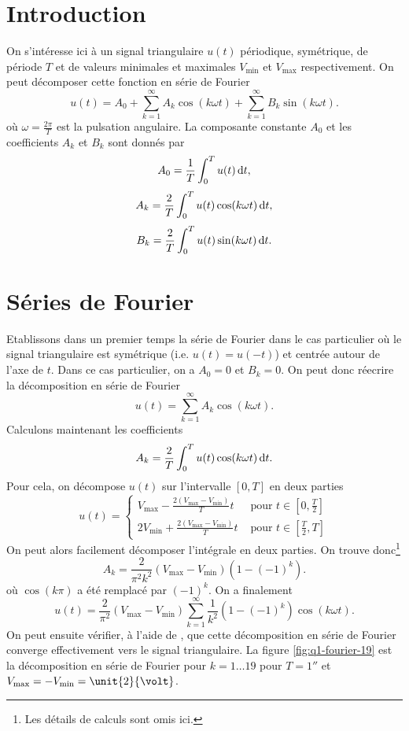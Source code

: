 

\section{Introduction}
On s'intéresse ici à un signal triangulaire $u(t)$
périodique, symétrique, de période $T$ et de valeurs 
minimales et maximales $V_{\text{min}}$ et $V_{\text{max}}$
respectivement. On peut décomposer cette fonction
en série de Fourier
\begin{equation}
	u(t) = A_0 + \sum_{k=1}^{\infty} A_k\cos(k\omega t)
	+ \sum_{k=1}^{\infty} B_k\sin(k\omega t).
	\label{eq:fourier-real}
\end{equation}
où $\omega = \frac{2\pi}{T}$ est la pulsation angulaire.
La composante constante $A_0$ et les coefficients $A_k$
et $B_k$ sont donnés par 
\begin{equation} 
	A_0 = \frac{1}{T} \int_0^T u(t)\operatorname{d}\! t,
	\label{eq:fourier-constant}
\end{equation}
\begin{equation}
	A_k = \frac{2}{T} \int_0^T u(t)\cos(k\omega t)\operatorname{d}\! t,
	\label{eq:fourier-coef-cos}
\end{equation}
\begin{equation}
	B_k = \frac{2}{T} \int_0^T u(t)\sin(k\omega t)\operatorname{d}\! t.
	\label{eq:fourier-coef-sin}
\end{equation}

\section{Séries de Fourier}
Etablissons dans un premier temps la série de Fourier
dans le cas particulier où le signal triangulaire
est symétrique (i.e. $u(t) = u(-t)$) et centrée autour
de l'axe de $t$. Dans ce cas particulier, on a $A_0 = 0$
et $B_k = 0$. On peut donc réecrire la décomposition
en série de Fourier 
\[ u(t) = \sum_{k=1}^{\infty} A_k\cos(k\omega t).\]
Calculons maintenant les coefficients
\[ A_k = \frac{2}{T} \int_0^T u(t)\cos(k\omega t)\operatorname{d}\! t.\]
Pour cela, on décompose $u(t)$ sur l'intervalle $[0,T]$
en deux parties
\[ u(t) =
	\left\{
		\begin{array}{rl}
			V_{\text{max}} - \frac{2(V_{\text{max}}-V_{\text{min}})}{T}t 	
			&\text{ pour } t \in [0,\frac{T}{2}]  \\
			2V_{\text{min}} + \frac{2(V_{\text{max}}-V_{\text{min}})}{T}t 
			&\text{ pour }t \in [\frac{T}{2},T] 
		\end{array}
	\right.
\]
On peut alors facilement décomposer l'intégrale en deux
parties. On trouve donc\footnote{Les détails
de calculs sont omis ici.}
\[ A_k = \frac{2}{\pi^2k^2}(V_{\text{max}}-V_{\text{min}})
(1 - (-1)^k).\]
où $\cos(k\pi)$ a été remplacé par $(-1)^k$.
On a finalement
\[ u(t) = \frac{2}{\pi^2}(V_{\text{max}}-V_{\text{min}})
\sum_{k=1}^{\infty} \frac{1}{k^2}(1 - (-1)^k)\cos(k\omega t).\]
On peut ensuite vérifier, à l'aide de \matlab,
que cette décomposition en série de Fourier
converge effectivement vers le signal triangulaire.
La figure \ref{fig:q1-fourier-19} est la décomposition
en série de Fourier pour $k = 1\dots19$ pour 
$T = \unit{1}{\second}$ et $V_{\text{max}} = 
-V_{\text{min}} = \unit{2}{\volt}$.


